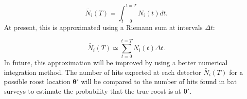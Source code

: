 \documentclass{article}
\begin{document}
\begin{equation}
  \tilde{N_i}(T) = \int_{t=0}^{t=T} N_i(t) dt.
\end{equation}
%
At present, this is approximated using a Riemann sum at intervals $\Delta t$:

\begin{equation}
  \tilde{N_i}(T) \simeq \sum_{t=0}^{t=T} N_i(t) \Delta t.
  \label{eqn:expect_hits}
\end{equation}
%
In future, this approximation will be improved by using a better numerical
integration method. The number of hits expected at each detector $\tilde{N_i}(T)$ for a possible roost location $\bm{\theta'}$ will be compared to the number of hits found in bat surveys to estimate the probability that the true roost is at $\bm{\theta'}$.
\end{document}
